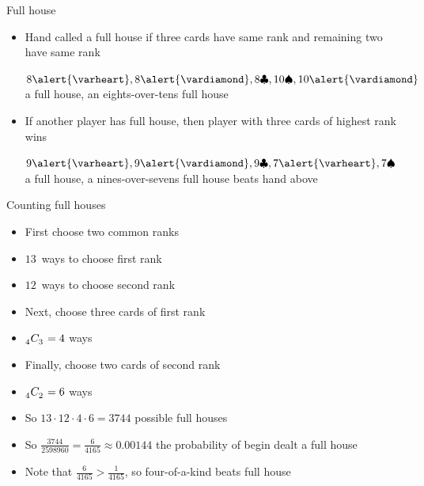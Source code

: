 \documentclass[handout]{beamer}
\theoremstyle{definition}
\newcommand\ncr[2]{\tensor[_{#1}]C{_{#2}}}
\newcommand{\hs}{\alert{\varheart}}
\newcommand{\ds}{\alert{\vardiamond}}
\newcommand{\s}{\spadesuit}
\newcommand{\cs}{\clubsuit}
\begin{document}
\begin{frame}{Full house}
\begin{itemize}
\item Hand called a \alert{full house} if three
cards have same rank and remaining two have same rank
\begin{example} $8\hs,8\ds,8\cs,10\s,10\ds$ a full house,
an \alert{eights-over-tens full house}\end{example}
\item If another player has full house, then player with
three cards of highest rank wins
\begin{example} $9\hs,9\ds,9\cs,7\hs,7\s$ a full house,
a \alert{nines-over-sevens full house}
beats hand above\end{example}
\end{itemize}
\end{frame}

\begin{frame}{Counting full houses}
\begin{itemize}
\item First choose two common ranks
\item $13$~ways to choose first rank
\item $12$~ways to choose second rank
\item Next, choose three cards of first rank
\item $\ncr{4}{3}=4$ ways
\item Finally, choose two cards of second rank
\item $\ncr{4}{2}=6$ ways
\item So $13\cdot 12\cdot 4\cdot 6=3744$ possible full houses
\item So $\frac{3744}{2598960}=\frac{6}{4165}\approx 0.00144$
the probability of begin dealt a full house
\item Note that $\frac{6}{4165}>\frac{1}{4165}$,
so four-of-a-kind beats full house
\end{itemize}
\end{frame}
\end{document}
